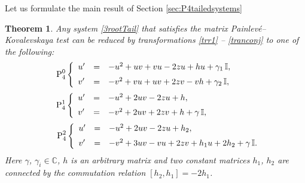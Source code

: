 \documentclass{article}
\theoremstyle{plain}
\newtheorem{theorem}{Theorem}
\newcommand{\PPainleve}{Painlev{\'e}}
\newcommand{\PIVn}[1]{\text{P}_4^{ #1 }}
\begin{document}
Let us formulate the main result of Section \ref{sec:P4tailedsystems} 
\begin{theorem} Any system \eqref{3rootTail}  that satisfies the matrix \PPainleve--Kovalevskaya test can be reduced by transformations \eqref{trr1} -- \eqref{tranconj} to one of the following:
\begin{align} \label{eq:case1tail_can}
    \tag*{$\PIVn{0}$}
    &\left\{
    \begin{array}{lcl}
         u' 
         &=& - u^2 + u v + v u - 2 z u 
         + h u 
         + \gamma_1 \, \mathbb{I},
         \\[2mm]
         v' 
         &=& - v^2 + v u + u v + 2 z v
         - v h
         + \gamma_2 \, \mathbb{I},
    \end{array}
    \right.
    \hspace{1.15cm}
\end{align}
\begin{align} 
    \label{eq:case3tail_can}
    \tag*{$\PIVn{1}$}
    &\left\{
    \begin{array}{lcl}
         u' 
         &=& - u^2 + 2 u v - 2 z u 
         + h,
         \\[2mm]
         v' 
         &=& - v^2 + 2 u v + 2 z v
         + h + \gamma \, \mathbb{I},
    \end{array}
    \right.
    \hspace{2.15cm}
\end{align}
\begin{align} 
    \label{eq:case5tail_can}
    \tag*{$\PIVn{2}$}
    &\left\{
    \begin{array}{lcl}
         u' 
         &=& - u^2 + 2 u v - 2 z u 
         + h_2,
         \\[2mm]
         v' 
         &=& - v^2 + 3 u v - v u + 2 z v
         + h_1 u 
         + 2 h_2 + \gamma \, \mathbb{I}.
    \end{array}
    \right.
\end{align}
Here $\gamma$, $\gamma_i \in \mathbb{C}$, $h$ is an arbitrary matrix and two constant matrices $h_1$, $h_2$ are connected by the commutation relation $[h_2, h_1] = - 2 h_1$. 
\end{theorem}
\end{document}
